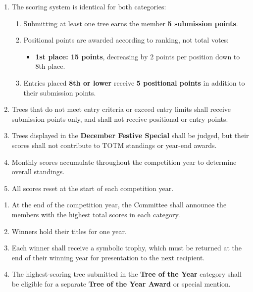 \setcounter{TOTMsection}{5} %
\begin{enumerate}
    \item The scoring system is identical for both categories:
        \begin{enumerate}
            \item Submitting at least one tree earns the member \textbf{5 submission points}.
            \item Positional points are awarded according to ranking, not total votes:
                \begin{itemize}
                    \item \textbf{1st place: 15 points}, decreasing by 2 points per position down to 8th place.
                \end{itemize}
            \item Entries placed \textbf{8th or lower} receive \textbf{5 positional points} in addition to their submission points.
        \end{enumerate}
    \item Trees that do not meet entry criteria or exceed entry limits shall receive submission points only, and shall not receive positional or entry points.
    \item Trees displayed in the \textbf{December Festive Special} shall be judged, but their scores shall not contribute to TOTM standings or year-end awards.
    \item Monthly scores accumulate throughout the competition year to determine overall standings.
    \item All scores reset at the start of each competition year.
\end{enumerate}

\setcounter{TOTMsection}{6} %
\begin{enumerate}
    \item At the end of the competition year, the Committee shall announce the members with the highest total scores in each category.
    \item Winners hold their titles for one year.
    \item Each winner shall receive a symbolic trophy, which must be returned at the end of their winning year for presentation to the next recipient.
    \item The highest-scoring tree submitted in the \textbf{Tree of the Year} category shall be eligible for a separate \textbf{Tree of the Year Award} or special mention.
\end{enumerate}
\columnbreak

